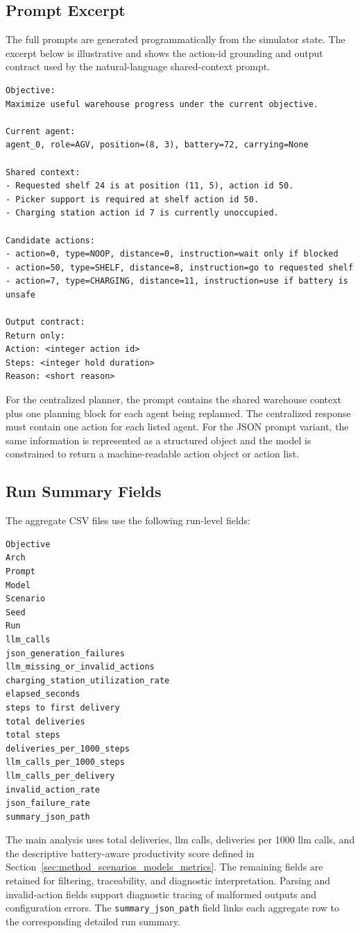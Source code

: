 \subsection{Prompt Excerpt}
\label{app:prompt_excerpt}
The full prompts are generated programmatically from the simulator state.
The excerpt below is illustrative and shows the action-id grounding and output contract used by the natural-language shared-context prompt.

\begin{lstlisting}[caption=Illustrative shared-context natural-language prompt excerpt., label=listing:prompt_excerpt]
Objective:
Maximize useful warehouse progress under the current objective.

Current agent:
agent_0, role=AGV, position=(8, 3), battery=72, carrying=None

Shared context:
- Requested shelf 24 is at position (11, 5), action id 50.
- Picker support is required at shelf action id 50.
- Charging station action id 7 is currently unoccupied.

Candidate actions:
- action=0, type=NOOP, distance=0, instruction=wait only if blocked
- action=50, type=SHELF, distance=8, instruction=go to requested shelf
- action=7, type=CHARGING, distance=11, instruction=use if battery is unsafe

Output contract:
Return only:
Action: <integer action id>
Steps: <integer hold duration>
Reason: <short reason>
\end{lstlisting}

For the centralized planner, the prompt contains the shared warehouse context plus one planning block for each agent being replanned.
The centralized response must contain one action for each listed agent.
For the JSON prompt variant, the same information is represented as a structured object and the model is constrained to return a machine-readable action object or action list.

\subsection{Run Summary Fields}
\label{app:run_summary_fields}
The aggregate CSV files use the following run-level fields:
\begin{lstlisting}[caption=Run-summary CSV fields used for aggregation., label=listing:summary_fields]
Objective
Arch
Prompt
Model
Scenario
Seed
Run
llm_calls
json_generation_failures
llm_missing_or_invalid_actions
charging_station_utilization_rate
elapsed_seconds
steps to first delivery
total deliveries
total steps
deliveries_per_1000_steps
llm_calls_per_1000_steps
llm_calls_per_delivery
invalid_action_rate
json_failure_rate
summary_json_path
\end{lstlisting}

The main analysis uses total deliveries, \gls{llm} calls, deliveries per 1000 \gls{llm} calls, and the descriptive battery-aware productivity score defined in Section~\ref{sec:method_scenarios_models_metrics}.
The remaining fields are retained for filtering, traceability, and diagnostic interpretation.
Parsing and invalid-action fields support diagnostic tracing of malformed outputs and configuration errors.
The \nolinkurl{summary_json_path} field links each aggregate row to the corresponding detailed run summary.
